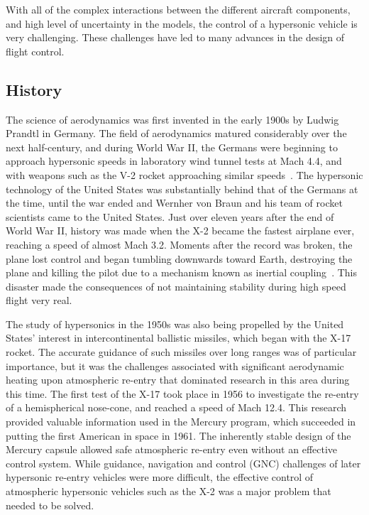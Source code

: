 With all of the complex interactions between the different aircraft components, and high level of uncertainty in the models, the control of a hypersonic vehicle is very challenging.
These challenges have led to many advances in the design of flight control.

\subsection{History}

The science of aerodynamics was first invented in the early 1900s by Ludwig Prandtl in Germany.
The field of aerodynamics matured considerably over the next half-century, and during World War II, the Germans were beginning to approach hypersonic speeds in laboratory wind  tunnel tests at Mach 4.4, and with weapons such as the V-2 rocket approaching similar speeds\ \cite{heppenheimer.heatbarrier.2009}.
The hypersonic technology of the United States was substantially behind that of the Germans at the time, until the war ended and Wernher von Braun and his team of rocket scientists came to the United States.
Just over eleven years after the end of World War II, history was made when the X-2 became the fastest airplane ever, reaching a speed of almost Mach 3.2.
Moments after the record was broken, the plane lost control and began tumbling downwards toward Earth, destroying the plane and killing the pilot due to a mechanism known as inertial coupling\ \cite{nelson.flightcontrol.1998}.
This disaster made the consequences of not maintaining stability during high speed flight very real.

The study of hypersonics in the 1950s was also being propelled by the United States' interest in intercontinental ballistic missiles, which began with the X-17 rocket.
The accurate guidance of such missiles over long ranges was of particular importance, but it was the challenges associated with significant aerodynamic heating upon atmospheric re-entry that dominated research in this area during this time.
The first test of the X-17 took place in 1956 to investigate the re-entry of a hemispherical nose-cone, and reached a speed of Mach 12.4.
This research provided valuable information used in the Mercury program, which succeeded in putting the first American in space in 1961.
The inherently stable design of the Mercury capsule allowed safe atmospheric re-entry even without an effective control system.
While guidance, navigation and control (GNC) challenges of later hypersonic re-entry vehicles were more difficult, the effective control of atmospheric hypersonic vehicles such as the X-2 was a major problem that needed to be solved.

